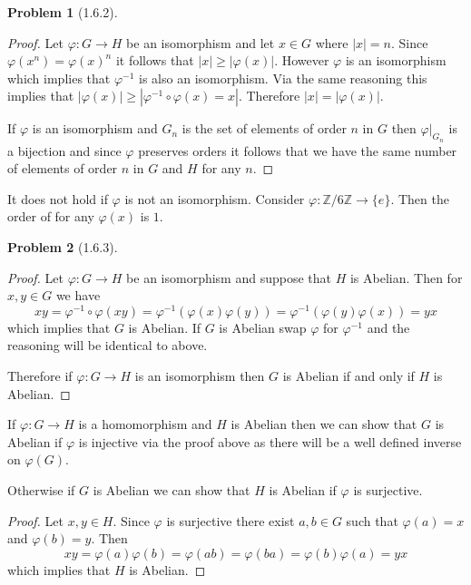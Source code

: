 \documentclass[10pt]{article}
\newcommand{\sk}{\vskip 10mm}
\newcommand{\bb}[1]{\mathbb{#1}}
\theoremstyle{plain}
\newtheorem{problem}{Problem}
\theoremstyle{remark}
\begin{document}
\begin{problem}[1.6.2]
  
\end{problem}

\begin{proof}
  Let $\varphi:G\rightarrow H$ be an isomorphism and let $x\in G$ where $|x|=n$. Since
  $\varphi(x^n)=\varphi(x)^n$ it follows that $|x|\geq|\varphi(x)|$. However
  $\varphi$ is an isomorphism which implies that $\varphi^{-1}$ is also an
  isomorphism. Via the same reasoning this implies that
  $|\varphi(x)|\geq|\varphi^{-1}\circ\varphi(x)=x|$. Therefore $|x|=|\varphi(x)|$.

  If $\varphi$ is an isomorphism and $G_n$ is the set of elements of
  order $n$ in $G$ then $\varphi|_{G_n}$ is a bijection and since
  $\varphi$ preserves orders it follows that we have the same
  number of elements of order $n$ in $G$ and $H$ for any $n$.
\end{proof}

It does not hold if $\varphi$ is not an isomorphism. Consider
$\varphi:\bb{Z}/6\bb{Z}\rightarrow\{e\}$. Then the order of for any $\varphi(x)$ is
$1$.

\sk

\begin{problem}[1.6.3]
  
\end{problem}

\begin{proof}
  Let $\varphi:G\rightarrow H$ be an isomorphism and suppose that $H$ is Abelian.
  Then for $x,y\in G$ we have
  \[ xy = \varphi^{-1}\circ\varphi(xy)=\varphi^{-1}(\varphi(x)\varphi(y))=\varphi^{-1}(\varphi(y)\varphi(x))=yx \]
  which implies that $G$ is Abelian. If $G$ is Abelian
  swap $\varphi$ for $\varphi^{-1}$ and the reasoning will be identical to above.

  Therefore if $\varphi:G\rightarrow H$ is an isomorphism then $G$ is Abelian if and
  only if $H$ is Abelian.
\end{proof}

If $\varphi:G\rightarrow H$ is a homomorphism and $H$ is Abelian then we can show that
$G$ is Abelian if $\varphi$ is injective via the proof above as there will be
a well defined inverse on $\varphi(G)$.

Otherwise if $G$ is Abelian we can show that $H$ is Abelian if
$\varphi$ is surjective.

\begin{proof}
  Let $x,y\in H$. Since $\varphi$ is surjective there exist $a,b\in G$ such that
  $\varphi(a)=x$ and $\varphi(b)=y$. Then
  \[ xy = \varphi(a)\varphi(b)=\varphi(ab)=\varphi(ba)=\varphi(b)\varphi(a)=yx \]
  which implies that $H$ is Abelian.
\end{proof}
\end{document}

